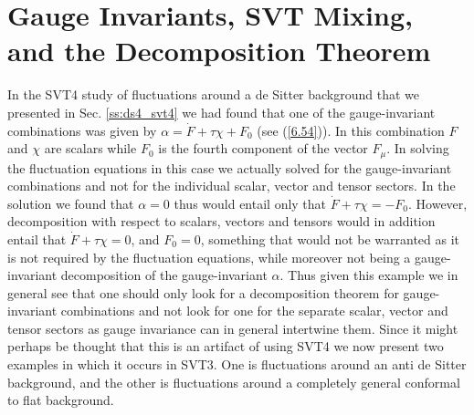 \section{Gauge Invariants, SVT Mixing, and the Decomposition Theorem}
\label{s:gauge_invariants_decomp_theorem}
In the SVT4 study of fluctuations around a de Sitter background that we presented in Sec. \ref{ss:ds4_svt4} we had found that one of the gauge-invariant combinations was given by $\alpha=\dot{F}+\tau \chi +F_0$ (see (\ref{6.54})). In this combination $F$ and $\chi$ are scalars while $F_0$ is the fourth component of the vector $F_{\mu}$. In solving the fluctuation equations in this case we actually solved for the gauge-invariant combinations and not for the individual scalar, vector and tensor sectors. In the solution we found that $\alpha=0$ thus would entail only that  $\dot{F}+\tau \chi =-F_0$. However, decomposition with respect to scalars, vectors and tensors would in addition entail that $\dot{F}+\tau \chi=0$, and $F_0=0$, something that would not be warranted as it is not required by the fluctuation equations, while moreover not being a gauge-invariant decomposition of the 
gauge-invariant $\alpha$. Thus given this example we in general see that one should only look for a decomposition theorem for gauge-invariant combinations and not look for one for the separate scalar, vector and tensor sectors as gauge invariance can in general intertwine them. Since it might perhaps be thought that this is an artifact of using SVT4 we now present two examples in which it occurs in SVT3. One is fluctuations around an anti de Sitter background, and the other is fluctuations around a completely general conformal to flat background.

